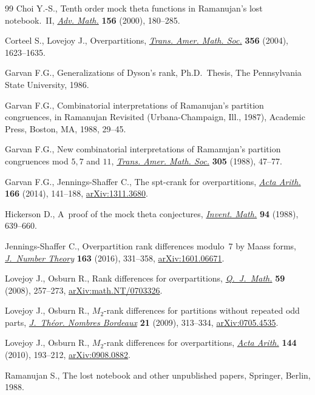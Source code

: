 \documentclass[10pt,a4paper]{amsart}
\numberwithin{equation}{section}
\begin{document}
\begin{thebibliography}{99}
Choi Y.-S., Tenth order mock theta functions in {R}amanujan's lost
  notebook.~{II}, \href{https://doi.org/10.1006/aima.2000.1948}{\textit{Adv. Math.}} \textbf{156} (2000), 180--285.

Corteel S., Lovejoy J., Overpartitions, \href{https://doi.org/10.1090/S0002-9947-03-03328-2}{\textit{Trans. Amer. Math. Soc.}}
  \textbf{356} (2004), 1623--1635.

Garvan F.G., Generalizations of {D}yson's rank, Ph.D.~Thesis, {T}he
  Pennsylvania State University, 1986.

Garvan F.G., Combinatorial interpretations of {R}amanujan's partition
  congruences, in Ramanujan Revisited ({U}rbana-{C}hampaign, {I}ll., 1987),
  Academic Press, Boston, MA, 1988, 29--45.

Garvan F.G., New combinatorial interpretations of {R}amanujan's partition
  congruences mod {$5,7$} and {$11$}, \href{https://doi.org/10.2307/2001040}{\textit{Trans. Amer. Math. Soc.}}
  \textbf{305} (1988), 47--77.

Garvan F.G., Jennings-Shaffer C., The spt-crank for overpartitions,
  \href{https://doi.org/10.4064/aa166-2-3}{\textit{Acta Arith.}} \textbf{166} (2014), 141--188, \href{https://arxiv.org/abs/1311.3680}{arXiv:1311.3680}.

Hickerson D., A~proof of the mock theta conjectures, \href{https://doi.org/10.1007/BF01394279}{\textit{Invent. Math.}}
  \textbf{94} (1988), 639--660.

Jennings-Shaffer C., Overpartition rank differences modulo~7 by {M}aass forms,
  \href{https://doi.org/10.1016/j.jnt.2015.11.018}{\textit{J.~Number Theory}} \textbf{163} (2016), 331--358, \href{https://arxiv.org/abs/1601.06671}{arXiv:1601.06671}.

Lovejoy J., Osburn R., Rank differences for overpartitions,
  \href{https://doi.org/10.1093/qmath/ham031}{\textit{Q.~J.~Math.}} \textbf{59} (2008), 257--273, \href{https://arxiv.org/abs/math.NT/0703326}{arXiv:math.NT/0703326}.

Lovejoy J., Osburn R., {$M_2$}-rank differences for partitions without repeated
  odd parts, \href{https://doi.org/10.5802/jtnb.673}{\textit{J.~Th\'eor. Nombres Bordeaux}} \textbf{21} (2009),
  313--334, \href{https://arxiv.org/abs/0705.4535}{arXiv:0705.4535}.

Lovejoy J., Osburn R., {$M_2$}-rank differences for overpartitions,
  \href{https://doi.org/10.4064/aa144-2-8}{\textit{Acta Arith.}} \textbf{144} (2010), 193--212, \href{https://arxiv.org/abs/0908.0882}{arXiv:0908.0882}.

Ramanujan S., The lost notebook and other unpublished papers, Springer, Berlin,
  1988.

\end{thebibliography}
\end{document}
